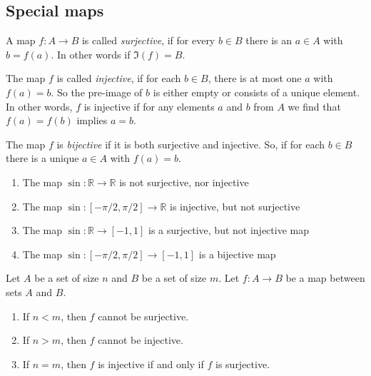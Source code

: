 \subsection{Special maps}
\begin{definition}
    A map $ f: A \to B $ is called \emph{surjective}, if for every $b \in B$ there is
    an $ a \in A $ with $ b = f(a) $. In other words if $ \Im(f) = B $.

    The map $f$ is called \emph{injective}, if for each $b \in B$, there is at most
    one $a$ with $ f(a) = b $. So the pre-image of $b$ is either empty or consists
    of a unique element. In other words, $f$ is injective if for any elements $a$
    and $b$ from $A$ we find that $ f(a) = f(b) $ implies $ a = b $.

    The map $f$ is \emph{bijective} if it is both surjective and injective. So, if
    for each $b \in B$ there is a unique $a \in A$ with $f(a) = b$.
\end{definition}

\begin{example}
    \begin{enumerate}[label=(\alph*)]
        \item The map $ \sin:\mathbb{R} \to \mathbb{R} $ is not surjective,
        nor injective
        \item The map $ \sin:\left[-\pi/2,\pi/2\right] \to \mathbb{R} $ is
        injective, but not surjective
        \item The map $ \sin:\mathbb{R} \to \left[-1,1\right] $ is a surjective,
        but not injective map
        \item The map $ \sin:\left[-\pi/2,\pi/2\right] \to \left[-1,1\right] $
        is a bijective map
    \end{enumerate}
\end{example}

\begin{theorem}
    Let $A$ be a set of size $n$ and $B$ be a set of size $m$. Let $ f:A \to B $
    be a map between sets $A$ and $B$.
    \begin{enumerate}[label=(\alph*)]
        \item If $ n < m $, then $f$ cannot be surjective.
        \item If $ n > m $, then $f$ cannot be injective.
        \item If $ n = m $, then $f$ is injective if and only if $f$ is surjective.
    \end{enumerate}
\end{theorem}

